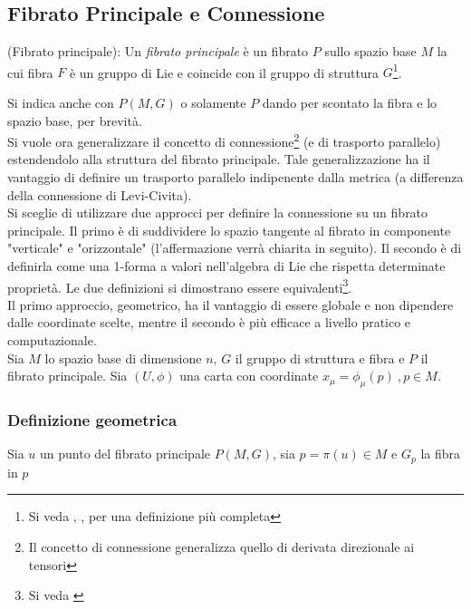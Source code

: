 \subsection{Fibrato Principale e Connessione}
\begin{definition}{(Fibrato principale)}:
   Un \emph{fibrato principale} è un fibrato $P$ sullo spazio base $M$ la cui
   fibra $F$ è un gruppo di Lie e coincide con il gruppo di struttura
   $G$\footnote{Si veda \cite{nakahara}, \cite{shnir}, \cite{eguchi}
   per una definizione più completa}.
\end{definition}
Si indica anche con $P(M,G)$ o solamente $P$ dando per scontato la fibra
e lo spazio base, per brevità.\\

Si vuole ora generalizzare il concetto di connessione\footnote{Il concetto di
connessione generalizza quello di derivata direzionale ai tensori}
(e di trasporto parallelo) estendendolo alla struttura del fibrato principale.
Tale generalizzazione ha il vantaggio di definire un trasporto parallelo
indipenente dalla metrica (a differenza della connessione di Levi-Civita). \\

Si sceglie di utilizzare due approcci per definire la connessione su un fibrato
principale. Il primo è di suddividere lo spazio tangente al fibrato in componente
"verticale" e "orizzontale" (l'affermazione verrà chiarita in seguito).
Il secondo è di definirla come una 1-forma a valori nell'algebra di Lie che
rispetta determinate proprietà. Le due definizioni si dimostrano essere
equivalenti\footnote{Si veda \cite{nakahara}}.\\
Il primo approccio, geometrico, ha il vantaggio di essere globale e non dipendere
dalle coordinate scelte, mentre il secondo è più efficace a livello pratico e
computazionale.\\

Sia $M$ lo spazio base di dimensione $n$, $G$ il gruppo di struttura e fibra e
$P$ il fibrato principale.
Sia $(U,\phi)$ una carta con coordinate $x_\mu = \phi_\mu(p) \:,p \in M$. \\

\subsubsection{Definizione geometrica }
Sia $u$ un punto del fibrato principale $P(M,G)$, sia $p = \pi(u) \in M$ e
$G_p$ la fibra in $p$\\

